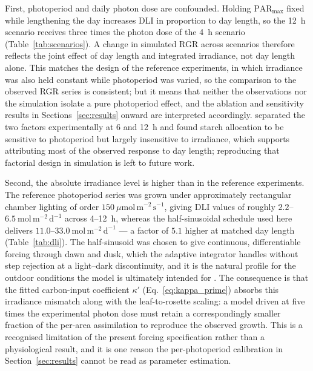 \documentclass[a4paper,fleqn]{cas-sc}
\begin{document}
First, photoperiod and daily photon dose are confounded. Holding
$\mathrm{PAR}_{\max}$ fixed while lengthening the day increases DLI in
proportion to day length, so the 12~h scenario receives three times the
photon dose of the 4~h scenario (Table~\ref{tab:scenarios}). A change in
simulated RGR across scenarios therefore reflects the joint effect of day
length and integrated irradiance, not day length alone. This matches the
design of the reference experiments, in which irradiance was also held
constant while photoperiod was varied, so the comparison to the observed
RGR series is consistent; but it means that neither the observations nor
the simulation isolate a pure photoperiod effect, and the ablation and
sensitivity results in Sections~\ref{sec:results} onward are interpreted
accordingly. \citet{Mengin2017} separated the two factors experimentally at
6 and 12~h and found starch allocation to be sensitive to photoperiod but
largely insensitive to irradiance, which supports attributing most of the
observed response to day length; reproducing that factorial design in
simulation is left to future work.

Second, the absolute irradiance level is higher than in the reference
experiments. The reference photoperiod series was grown under approximately
rectangular chamber lighting of order
$150\ \mu\mathrm{mol\,m^{-2}\,s^{-1}}$, giving DLI values of roughly
$2.2$--$6.5\ \mathrm{mol\,m^{-2}\,d^{-1}}$ across 4--12~h, whereas the
half-sinusoidal schedule used here delivers
$11.0$--$33.0\ \mathrm{mol\,m^{-2}\,d^{-1}}$ --- a factor of $5.1$ higher at
matched day length (Table~\ref{tab:dli}). The half-sinusoid was chosen to give
continuous, differentiable forcing through dawn and dusk, which the
adaptive integrator handles without step rejection at a light--dark
discontinuity, and it is the natural profile for the outdoor conditions the
model is ultimately intended for \citep{Annunziata2017}. The consequence is
that the fitted carbon-input coefficient $\kappa'$
(Eq.~\ref{eq:kappa_prime}) absorbs this irradiance mismatch along with the
leaf-to-rosette scaling: a model driven at five times the experimental
photon dose must retain a correspondingly smaller fraction of the
per-area assimilation to reproduce the observed growth. This is a
recognised limitation of the present forcing specification rather than a
physiological result, and it is one reason the per-photoperiod calibration
in Section~\ref{sec:results} cannot be read as parameter estimation.
\end{document}
